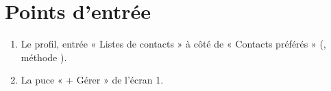 \section{Points d'entrée}

\begin{enumerate}[leftmargin=1.6em]
  \item Le profil, entrée « Listes de contacts » à côté de « Contacts préférés »
        (, méthode
        ).
  \item La puce « + Gérer » de l'écran 1.
\end{enumerate}
